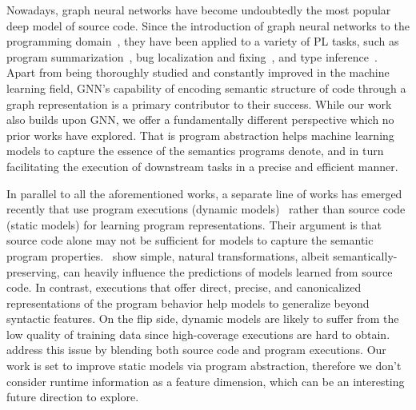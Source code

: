 Nowadays, graph neural networks have become undoubtedly the most popular deep model of source code. Since the introduction of graph neural networks to the programming domain~\cite{li2015gated,allamanis2017learning}, they have been applied to a variety of PL tasks, such as program summarization~\cite{fernandes2018structured}, bug localization and fixing~\cite{Dinella2020HOPPITY}, and type inference~\cite{Wei2020LambdaNet}. Apart from being thoroughly studied and constantly improved in the machine learning field, GNN's capability of encoding semantic structure of code through a graph representation is a primary contributor to their success. While our work also builds upon GNN, we offer a fundamentally different perspective which no prior works have explored. That is program abstraction helps machine learning models to capture the essence of the semantics programs denote, and in turn facilitating the execution of downstream tasks in a precise and efficient manner. 

In parallel to all the aforementioned works, a separate line of works has emerged recently that use program executions (\ie dynamic models)~\cite{wang2017dynamic,wang2019learning,Wang101145} rather than source code (\ie static models) for learning program representations. Their argument is that source code alone may not be sufficient for models to capture the semantic program properties.~\citet{wang2019coset} show simple, natural transformations, albeit semantically-preserving, can heavily influence the predictions of models learned from source code. In contrast, executions that offer direct, precise, and canonicalized representations of the program behavior help models to generalize beyond syntactic features. On the flip side, dynamic models are likely to suffer from the low quality of training data since high-coverage executions are hard to obtain.~\citet{Wang101145} address this issue by blending both
source code and program executions.
Our work is set to improve static models via program abstraction, therefore we don't consider runtime information as a feature dimension, which can be an interesting future direction to explore.
